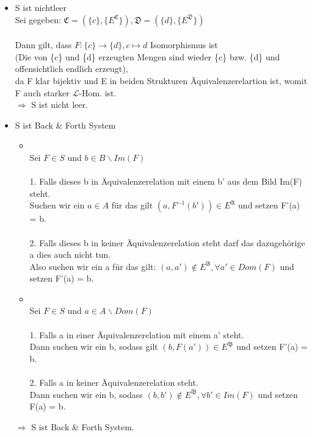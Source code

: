 \documentclass[a4paper]{scrartcl}
\begin{document}
    \begin{itemize}
        \item S ist nichtleer\\
            Sei gegeben: $\mathfrak{C} = (\{c\}, \{E^\mathfrak{C}\}), \mathfrak{D} = (\{d\}, \{E^\mathfrak{D}\})$\\
            \\Dann gilt, dass $F: \{c\} \rightarrow \{d\}, c \mapsto d$ Isomorphismus ist
            \\(Die von \{c\} und \{d\} erzeugten Mengen sind wieder \{c\} bzw. \{d\} und offensichtlich endlich erzeugt),\\
            da F klar bijektiv und E in beiden Strukturen Äquivalenzerelartion ist, womit F auch starker $\mathscr{L}$-Hom. ist.\\
            $\Rightarrow$ S ist nicht leer.\\

        \item S ist Back & Forth System\\
            \begin{itemize}
                \item {}\\
                    Sei $F \in S$ und $b \in B\backslash Im(F)$\\                  
                    \\1. Falls dieses b in Äquivalenzerelation mit einem b' aus dem Bild Im(F) steht.\\
                    Suchen wir ein $a \in A$ für das gilt $(a, F^{-1}(b')) \in E^{\mathfrak{A}}$ und setzen F'(a) = b.\\
                    \\2. Falls dieses b in keiner Äquivalenzerelation steht darf das dazugehörige a dies auch nicht tun.\\
                    Also suchen wir ein a für das gilt: $(a, a') \notin E^{\mathfrak{A}}, \forall a' \in Dom(F)$ und setzen F'(a) = b.\\

                \item {}\\
                    Sei $F \in S$ und $a \in A\backslash Dom(F)$\\
                    \\1. Falls a in einer Äquivalenzerelation mit einem a' steht.\\
                    Dann suchen wir ein b, sodass gilt $(b, F(a')) \in E^{\mathfrak{B}}$ und setzen F'(a) = b.\\
                    \\2. Falls a in keiner Äquivalenzerelation steht.\\
                    Dann suchen wir ein b, sodass $(b, b') \notin E^{\mathfrak{B}}, \forall b' \in Im(F)$ und setzen F(a) = b.\\
            \end{itemize}

            $\Rightarrow$ S ist Back \& Forth System.\\
    \end{itemize}
\end{document}
